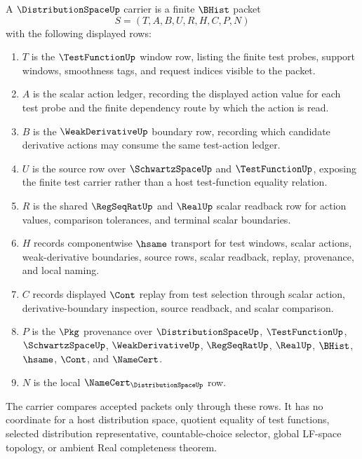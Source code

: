 \begin{definition}
\label{def:distribution-space-carrier}
A $\DistributionSpaceUp$ carrier is a finite $\BHist$ packet
$$
S=(T,A,B,U,R,H,C,P,N)
$$
with the following displayed rows:
\begin{enumerate}
\item $T$ is the $\TestFunctionUp$ window row, listing the finite test probes, support windows, smoothness tags, and request indices visible to the packet.
\item $A$ is the scalar action ledger, recording the displayed action value for each test probe and the finite dependency route by which the action is read.
\item $B$ is the $\WeakDerivativeUp$ boundary row, recording which candidate derivative actions may consume the same test-action ledger.
\item $U$ is the source row over $\SchwartzSpaceUp$ and $\TestFunctionUp$, exposing the finite test carrier rather than a host test-function equality relation.
\item $R$ is the shared $\RegSeqRatUp$ and $\RealUp$ scalar readback row for action values, comparison tolerances, and terminal scalar boundaries.
\item $H$ records componentwise $\hsame$ transport for test windows, scalar actions, weak-derivative boundaries, source rows, scalar readback, replay, provenance, and local naming.
\item $C$ records displayed $\Cont$ replay from test selection through scalar action, derivative-boundary inspection, source readback, and scalar comparison.
\item $P$ is the $\Pkg$ provenance over $\DistributionSpaceUp$, $\TestFunctionUp$, $\SchwartzSpaceUp$, $\WeakDerivativeUp$, $\RegSeqRatUp$, $\RealUp$, $\BHist$, $\hsame$, $\Cont$, and $\NameCert$.
\item $N$ is the local $\NameCert_{\DistributionSpaceUp}$ row.
\end{enumerate}
The carrier compares accepted packets only through these rows. It has no coordinate for a host distribution space, quotient equality of test functions, selected distribution representative, countable-choice selector, global LF-space topology, or ambient Real completeness theorem.
\end{definition}

